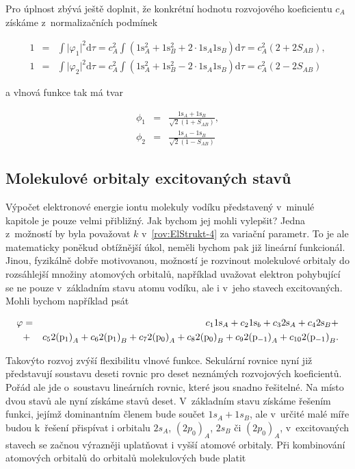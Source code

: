 Pro úplnost zbývá ještě doplnit, že konkrétní hodnotu rozvojového koeficientu $c_A$ získáme z~normalizačních podmínek


\begin{eqnarray}
1 &=& \int \vert \varphi_1 \vert^2 \mathrm{d}\tau = c_A^2 \int (1\mathrm{s}_A^2 + 1 \mathrm{s}_B^2 + 2 \cdot 1\mathrm{s}_A 1\mathrm{s}_B) \mathrm{d}\tau = c_A^2 (2 + 2S_{AB}), \nonumber \\
1 &=& \int \vert \varphi_2 \vert^2 \mathrm{d}\tau = c_A^2 \int (1\mathrm{s}_A^2 + 1 \mathrm{s}_B^2 - 2 \cdot 1\mathrm{s}_A 1\mathrm{s}_B) \mathrm{d}\tau = c_A^2 (2 - 2S_{AB}) 
\label{rov:ElStrukt-14}
\end{eqnarray}


\noindent a vlnová funkce tak má tvar


\begin{eqnarray}
\phi_1 &=& \frac{1\mathrm{s}_A + 1\mathrm{s}_B}{\sqrt{2}(1+S_{AB})}, \nonumber \\
\phi_2 &=& \frac{1\mathrm{s}_A - 1\mathrm{s}_B}{\sqrt{2}(1-S_{AB})}
\label{rov:ElStrukt-15}
\end{eqnarray}

\subsection{Molekulové orbitaly excitovaných stavů}

Výpočet elektronové energie iontu molekuly vodíku představený v~minulé kapitole je pouze velmi přibližný. Jak bychom jej mohli vylepšit? Jedna z~možností by byla považovat $k$ v~\eqref{rov:ElStrukt-4} za variační parametr. To je ale matematicky poněkud obtížnější úkol, neměli bychom pak již lineární funkcionál. Jinou, fyzikálně dobře motivovanou, možností je rozvinout molekulové orbitaly do rozsáhlejší množiny atomových orbitalů, například uvažovat elektron pohybující se ne pouze v~základním stavu atomu vodíku, ale i v~jeho stavech excitovaných. Mohli bychom například psát

\begin{eqnarray}
\varphi &=& c_1 1 \mathrm{s}_{A} + c_2 1 \mathrm{s}_{b} + c_3 2 \mathrm{s}_{A} + c_4 2 \mathrm{s}_{B} + \nonumber \\
&+& c_5 2 \mathrm{(p_1)}_{A} + c_6 2 \mathrm{(p_1)}_{B} + c_7 2 \mathrm{(p_0)}_{A} + c_8 2 \mathrm{(p_0)}_{B} + c_9 2 \mathrm{(p_{-1})}_{A} + c_{10} 2 \mathrm{(p_{-1})}_{B}.
\label{rov:ElStrukt-16}
\end{eqnarray}

\noindent Takovýto rozvoj zvýší flexibilitu vlnové funkce. Sekulární rovnice nyní již představují soustavu deseti rovnic pro deset neznámých rozvojových koeficientů. Pořád ale jde o~soustavu lineárních rovnic, které jsou snadno řešitelné. Na místo dvou stavů ale nyní získáme stavů deset. V~základním stavu získáme řešením funkci, jejímž dominantním členem bude součet $1s_A+1s_B$, ale v~určité malé míře budou k~řešení přispívat i orbitalu $2s_A$, $(2p_0)_A$, $2s_B$ či $(2p_0)_A$, v~excitovaných stavech se začnou výrazněji uplatňovat i vyšší atomové orbitaly. Při kombinování atomových orbitalů do orbitalů molekulových bude platit

